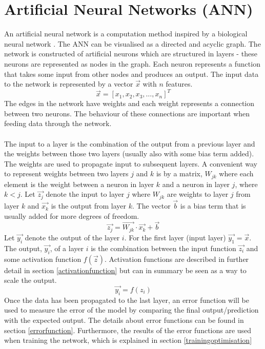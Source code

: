 \section{Artificial Neural Networks (ANN)}
An artificial neural network is a computation method inspired by a biological neural network \parencite{lippmann1987introduction}. The ANN can be visualised as a directed and acyclic graph. The network is constructed of artificial neurons which are structured in layers - these neurons are represented as nodes in the graph. Each neuron represents a function that takes some input from other nodes and produces an output. The input data to the network is represented by a vector $\vec{x}$ with $n$ features.
\begin{equation}
    \vec{x} = [x_1, x_2, x_3, \dots , x_n]^T
\end{equation}
The edges in the network have weights and  each weight represents a connection between two neurons. The behaviour of these connections are important when feeding data through the network.
\\\\
The input to a layer is the combination of the output from a previous layer and the weights between those two layers (usually also with some bias term added). The weights are used to propagate input to subsequent layers. A convenient way to represent weights between two layers $j$ and $k$ is by a matrix, $W_{jk}$ where each element is the weight between a neuron in layer $k$ and a neuron in layer $j$, where $k<j$. Let $\vec{z_j}$ denote the input to layer $j$ where $W_{jk}$ are weights to layer $j$ from layer $k$ and $\vec{x_k}$ is the output from layer $k$. The vector $\vec{b}$ is a bias term that is usually added for more degrees of freedom. 
\begin{equation}
    \vec{z_j} = \vec{W_{jk}} \cdot \vec{x_k} + \vec{b}
\end{equation}
Let $\vec{y_i}$ denote the output of the layer $i$. For the first layer (input layer) $\vec{y_1}=\vec{x}$. The output, $\vec{y_i}$, of a layer $i$ is the combination between the input function $\vec{z_i}$ and some activation function $f(\vec{z})$. Activation functions are described in further detail in section \ref{activationfunction} but can in summary be seen as a way to scale the output.
\begin{equation}
    \vec{y_i} = f(z_i)
\end{equation}
Once the data has been propagated to the last layer, an error function will be used to measure the error of the model by comparing the final output/prediction with the expected output. The details about error functions can be found in section \ref{errorfunction}. Furthermore, the results of the error functions are used when training the network, which is explained in section \ref{trainingoptimisation}

